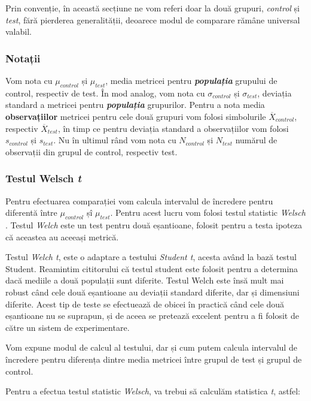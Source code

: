 Prin convenție, în această secțiune ne vom referi doar la două grupuri, \textit{control} și \textit{test}, fără pierderea generalității, deoarece modul de comparare rămâne universal valabil.

\subsubsection{Notații}

Vom nota cu  $\mu_{control}$ și $\mu_{test}$, media metricei pentru \textit{\textbf{populația}} grupului de control, respectiv de test. În mod analog, vom nota cu $\sigma_{control}$ și $\sigma_{test}$, deviația standard a metricei pentru \textit{\textbf{populația}} grupurilor. Pentru a nota media \textbf{observațiilor} metricei pentru cele două grupuri vom folosi simbolurile $\overline{X}_{control}$, respectiv $\overline{X}_{test}$, în timp ce pentru deviația standard a observațiilor vom folosi $s_{control}$ și $s_{test}$. Nu în ultimul rând vom nota cu $N_{control}$ și $N_{test}$ numărul de observații din grupul de control, respectiv test.

\subsubsection{Testul Welsch \textit{t}}

Pentru efectuarea comparației vom calcula intervalul de încredere pentru diferentă între $\mu_{control}$ șî $\mu_{test}$. Pentru acest lucru vom folosi testul statistic  \textit{Welsch} \cite{Welch1947}. Testul \textit{Welch} este un test pentru două eșantioane, folosit pentru a testa ipoteza că aceastea au aceeași metrică. 

Testul \textit{Welch t}, este o adaptare a testului \textit{Student t}, acesta având la bază testul Student. Reamintim cititorului că testul student este folosit pentru a determina dacă mediile a două populații sunt diferite. Testul Welch este însă mult mai robust când cele două eșantioane au deviații standard diferite, dar și dimensiuni diferite. Acest tip de teste se efectuează de obicei în practică când cele două eșantioane nu se suprapun, și de aceea se pretează excelent pentru a fi folosit de către un sistem de experimentare. 

Vom expune modul de calcul al testului, dar și cum putem calcula intervalul de încredere pentru diferența dintre media metricei între grupul de test și grupul de control.

Pentru a efectua testul statistic \textit{Welsch}, va trebui să calculăm statistica \textit{t}\cite{Welch1947}, astfel:

